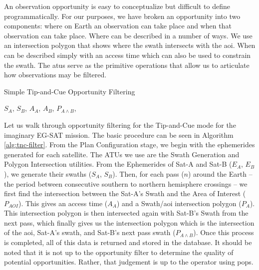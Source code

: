 An observation opportunity is easy to conceptualize but difficult to define
programmatically. For our purposes, we have broken an opportunity into two
components: where on Earth an observation can take place and when that
observation can take place. Where can be described in a number of ways. We use
an intersection polygon that shows where the swath intersects with the
\gls{aoi}.  When can be described simply with an access time which can also be
used to constrain the swath. The \glspl{atu} serve as the primitive operations
that allow us to articulate how observations may be filtered.



\begin{algorithm*}[h] 
    \caption{Simple Tip-and-Cue Opportunity Filtering}
    \label{alg:tnc-filter} 
    \begin{algorithmic}[1] 


	    \EndFor
	    \State \Return $S_{A}$, $S_{B}$, $A_{A}$, $A_{B}$, $P_{A \wedge B}$,  
	\EndFunction

    \end{algorithmic} 
\end{algorithm*}


Let us walk through opportunity filtering for the Tip-and-Cue mode for the
imaginary EG-SAT mission. The basic procedure can be seen in Algorithm
\ref{alg:tnc-filter}. From the Plan Configuration stage, we begin with the
ephemerides generated for each satellite. The ATUs we use are the Swath
Generation and Polygon Intersection utilities. From the Ephemerides of Sat-A
and Sat-B ($E_A$, $E_B$), we generate their swaths ($S_A$, $S_B$). Then, for
each pass ($n$) around the Earth – the period between consecutive southern to
northern hemisphere crossings – we first find the intersection between the
Sat-A’s Swath and the Area of Interest ($P_{AOI}$).  This gives an access time
($A_A$) and a Swath/\gls{aoi} intersection polygon ($P_A$). This intersection
polygon is then intersected again with Sat-B’s Swath from the next pass, which
finally gives us the intersection polygon which is the intersection of the
\gls{aoi}, Sat-A’s swath, and Sat-B’s next pass swath ($P_{A \wedge B}$). Once
this process is completed, all of this data is returned and stored in the
database. It should be noted that it is not up to the opportunity filter to
determine the quality of potential opportunities. Rather, that judgement is up
to the operator using \gls{pops}.

